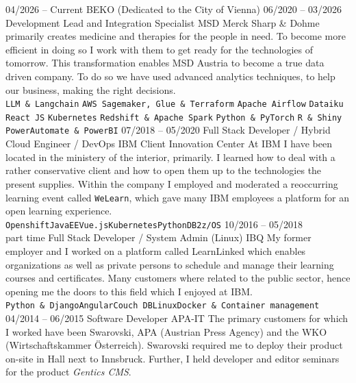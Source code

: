 \documentclass[9pt]{developercv} %
\begin{document}
\begin{entrylist}
	\entry
		{04/2026 -- Current}
		{\titlebeko}
		{BEKO (Dedicated to the City of Vienna)}
		{\textbeko}
	\entry
		{06/2020 -- 03/2026}
		{Development Lead and Integration Specialist}
		{MSD}
		{Merck Sharp \& Dohme primarily creates medicine and therapies for the people in need. To become more efficient in doing so I work with them to get ready for the technologies of tomorrow. This transformation enables MSD Austria to become a true data driven company. To do so we have used advanced analytics techniques, to help our business, making the right decisions. \\ 
			\texttt{LLM \& Langchain} \slashsep \texttt{AWS Sagemaker, Glue \& Terraform} \slashsep \texttt{Apache Airflow} \slashsep \texttt{Dataiku}  \slashsep \texttt{React JS} \slashsep \texttt{Kubernetes} \slashsep \texttt{Redshift \& Apache Spark} \slashsep \texttt{Python \& PyTorch} \slashsep \texttt{R \& Shiny}  \slashsep \texttt{PowerAutomate \& PowerBI}
		}
	\entry
		{07/2018 -- 05/2020}
		{Full Stack Developer / Hybrid Cloud Engineer / DevOps}
		{IBM Client Innovation Center}
		{At IBM I have been located in the ministery of the interior, primarily. I learned how to deal with a rather conservative client and how to open them up to the technologies the present supplies. Within the company I employed and moderated a reoccurring learning event called \texttt{WeLearn}, which gave many IBM employees a platform for an open learning experience. \\
			\texttt{Openshift}\slashsep\texttt{JavaEE}\slashsep\texttt{Vue.js}\slashsep\texttt{Kubernetes}\slashsep\texttt{Python}\slashsep\texttt{DB2}\slashsep\texttt{z/OS}
		}
	\entry
		{10/2016 -- 05/2018\\\footnotesize{part time}}
		{Full Stack Developer / System Admin (Linux)}
		{IBQ}
		{My former employer and I worked on a platform called LearnLinked which enables organizations as well as private persons to schedule and manage their learning courses and certificates. Many customers where related to the public sector, hence opening me the doors to this field which I enjoyed at IBM.\\ 
			\texttt{Python \& Django}\slashsep\texttt{Angular}\slashsep\texttt{Couch DB}\slashsep\texttt{Linux}\slashsep\texttt{Docker \& Container management}}
	\entry
		{04/2014 -- 06/2015}
		{Software Developer}
		{APA-IT}
		{The primary customers for which I worked have been Swarovski, APA (Austrian Press Agency) and the WKO (Wirtschaftskammer Österreich). Swarovski required me to deploy their product on-site in Hall next to Innsbruck. Further, I held developer and editor seminars for the product \textit{Gentics CMS}. \\ 
}
\end{entrylist}
\end{document}
